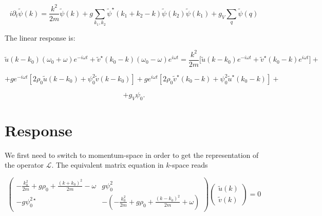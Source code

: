 \documentclass[a4paper,prb,10pt,aps]{revtex4-1}
\begin{document}
\begin{equation}
i\partial_{t}\widetilde{\psi}(k)=\frac{k^{2}}{2m}\widetilde{\psi}(k)+g\sum_{k_{1},k_{2}}\widetilde{\psi}^{\star}\left(k_{1}+k_{2}-k\right)\widetilde{\psi}\left(k_{2}\right)\widetilde{\psi}\left(k_{1}\right)+g_{V}\sum_{q}\widetilde{\psi}(q)
\end{equation}

The linear response is:


\begin{equation}
  \label{eq:25}
\widetilde{u}\left(k-k_{0}\right)\left(\omega_{0}+\omega\right)e^{-i\omega t}+\widetilde{v}^{\star}\left(k_{0}-k\right)\left(\omega_{0}-\omega\right)e^{i\omega t}=\frac{k^{2}}{2m}\big[\widetilde{u}\left(k-k_{0}\right)e^{-i\omega t}+\widetilde{v}^{\star}\left(k_{0}-k\right)e^{i\omega t}\big]+
\end{equation}


\begin{equation}
  \label{eq:26}
+ge^{-i\omega t}\left[2\rho_{0}\widetilde{u}\left(k-k_{0}\right)+\psi_{0}^{2}\widetilde{v}\left(k-k_{0}\right)\right]+ge^{i\omega t}\left[2\rho_{0}\widetilde{v}^{\star}\left(k_{0}-k\right)+\psi_{0}^{2}\widetilde{u}^{\star}\left(k_{0}-k\right)\right]+
\end{equation}

\begin{equation}
  \label{eq:27}
+g_{V}\psi_{0}.  
\end{equation}



\section{Response}
We first need to switch to momentum-space in order to get the representation of the operator $\mathcal{L}$. The equivalent matrix equation in $k$-space reads


\begin{equation}
  \label{eq:28}
\left(\begin{array}{cc}
-\frac{k_{0}^{2}}{2m}+g\rho_{0}+\frac{(k+k_{0})^{2}}{2m}-\omega & g\psi_{0}^{2}\\
-g\psi_{0}^{2\star} & -\left(-\frac{k_{0}^{2}}{2m}+g\rho_{0}+\frac{(k-k_{0})^{2}}{2m}+\omega\right)
\end{array}\right)\left(\begin{array}{c}
\widetilde{u}(k)\\
\widetilde{v}(k)
\end{array}\right)=0  
\end{equation}
\end{document}
